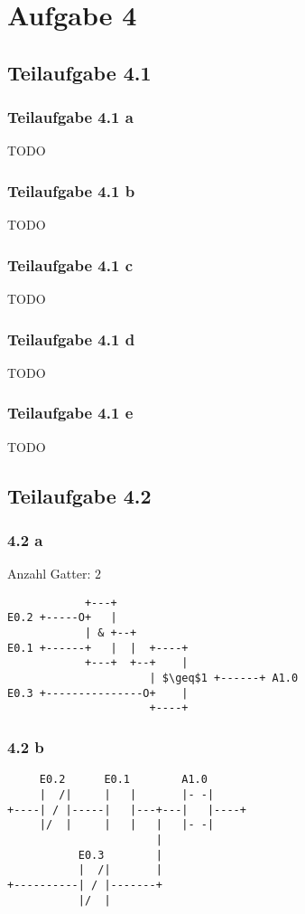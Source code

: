 \documentclass[a4paper]{scrartcl}
\begin{document}
  \section*{Aufgabe 4}
  \subsection*{Teilaufgabe 4.1}
  \subsubsection*{Teilaufgabe 4.1 a}
  TODO

  \subsubsection*{Teilaufgabe 4.1 b}
  TODO

  \subsubsection*{Teilaufgabe 4.1 c}
  TODO

  \subsubsection*{Teilaufgabe 4.1 d}
  TODO

  \subsubsection*{Teilaufgabe 4.1 e}
  TODO

  \subsection*{Teilaufgabe 4.2}
  \subsubsection*{4.2 a}
  Anzahl Gatter: $2$
  \begin{lstlisting}
            +---+
E0.2 +-----O+   |
            | & +--+
E0.1 +------+   |  |  +----+
            +---+  +--+    |
                      | $\geq$1 +------+ A1.0
E0.3 +---------------O+    |
                      +----+
  \end{lstlisting}

  \subsubsection*{4.2 b}
  \begin{lstlisting}
     E0.2      E0.1        A1.0
     |  /|     |   |       |- -|
+----| / |-----|   |---+---|   |----+
     |/  |     |   |   |   |- -|
                       |
           E0.3        |
           |  /|       |
+----------| / |-------+
           |/  |
  \end{lstlisting}
\end{document}
